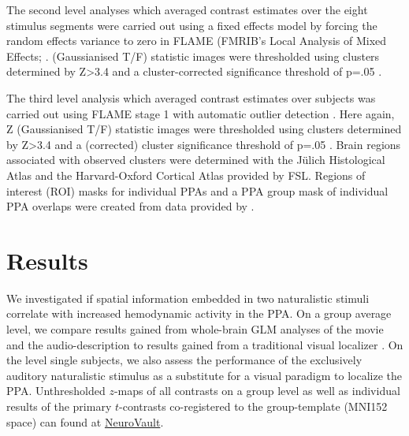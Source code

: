 \documentclass[english]{article}
\begin{document}
The second level analyses which averaged contrast estimates over the eight
stimulus segments were carried out using a fixed effects model by forcing the
random effects variance to zero in FLAME (FMRIB's Local Analysis of Mixed
Effects; \citep{beckmann2003general, woolrich2004multilevel}.
(Gaussianised T/F) statistic images were thresholded using clusters determined
by Z>3.4 and a cluster-corrected significance threshold of p=.05
\citep{worsley2001statistical}.

The third level analysis which averaged contrast estimates over subjects was
carried out using FLAME stage 1 with automatic outlier detection
\citep{beckmann2003general, woolrich2004multilevel, woolrich2008robust}.
Here again, Z (Gaussianised T/F) statistic images were thresholded using
clusters determined by Z>3.4 and a (corrected) cluster significance threshold of
p=.05 \citep{worsley2001statistical}.
Brain regions associated with observed clusters were determined with the Jülich
Histological Atlas \citep{eickhoff2005toolbox, eickhoff2007assignment} and the
Harvard-Oxford Cortical Atlas \citep{desikan2006automated} provided by FSL.
Regions of interest (ROI) masks for individual PPAs and a PPA group mask of
individual PPA overlaps were created from data provided by
\citep{sengupta2016extension}.


\section{Results}


We investigated if spatial information embedded in two naturalistic stimuli
correlate with increased hemodynamic activity in the PPA.
On a group average level, we compare results gained from whole-brain GLM
analyses of the movie and the audio-description to results gained from a
traditional visual localizer \citep{sengupta2016extension}.
On the level single subjects, we also assess the performance of the exclusively
auditory naturalistic stimulus as a substitute for a visual paradigm to localize
the PPA.
Unthresholded $z$-maps of all contrasts on a group level as well as individual
results of the primary $t$-contrasts co-registered to the group-template (MNI152
space) can found at
\href{https://neurovault.org/collections/KADGMGVZ/}{NeuroVault}.
\end{document}
